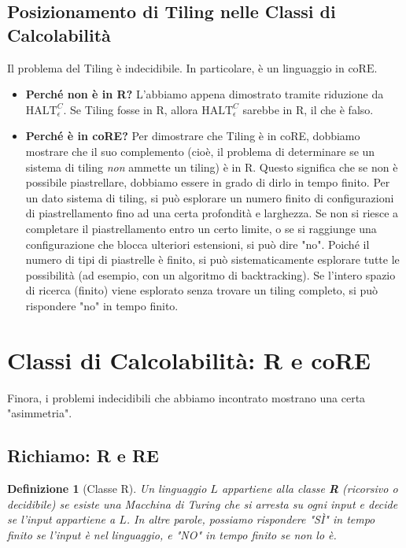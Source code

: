 \documentclass[a4paper, 11pt]{book} %
\newtheorem{definition}[theorem]{Definizione}
\theoremstyle{definition}
\begin{document}
\subsection{Posizionamento di Tiling nelle Classi di Calcolabilit\`a}
Il problema del Tiling è indecidibile. In particolare, è un linguaggio in $\text{coRE}$.
\begin{itemize}
    \item \textbf{Perché non è in R?} L'abbiamo appena dimostrato tramite riduzione da $\text{HALT}_\epsilon^C$. Se Tiling fosse in R, allora $\text{HALT}_\epsilon^C$ sarebbe in R, il che è falso.
    \item \textbf{Perché è in coRE?} Per dimostrare che Tiling è in coRE, dobbiamo mostrare che il suo complemento (cioè, il problema di determinare se un sistema di tiling \emph{non} ammette un tiling) è in R. Questo significa che se non è possibile piastrellare, dobbiamo essere in grado di dirlo in tempo finito.
    Per un dato sistema di tiling, si può esplorare un numero finito di configurazioni di piastrellamento fino ad una certa profondità e larghezza. Se non si riesce a completare il piastrellamento entro un certo limite, o se si raggiunge una configurazione che blocca ulteriori estensioni, si può dire "no". Poiché il numero di tipi di piastrelle è finito, si può sistematicamente esplorare tutte le possibilità (ad esempio, con un algoritmo di backtracking). Se l'intero spazio di ricerca (finito) viene esplorato senza trovare un tiling completo, si può rispondere "no" in tempo finito.
\end{itemize}

\section{Classi di Calcolabilit\`a: R e coRE}
Finora, i problemi indecidibili che abbiamo incontrato mostrano una certa "asimmetria".

\subsection{Richiamo: R e RE}
\begin{definition}[Classe R]
Un linguaggio $L$ appartiene alla classe \textbf{R} (ricorsivo o decidibile) se esiste una Macchina di Turing che si arresta su ogni input e decide se l'input appartiene a $L$. In altre parole, possiamo rispondere "SÌ" in tempo finito se l'input è nel linguaggio, e "NO" in tempo finito se non lo è.
\end{definition}
\end{document}
